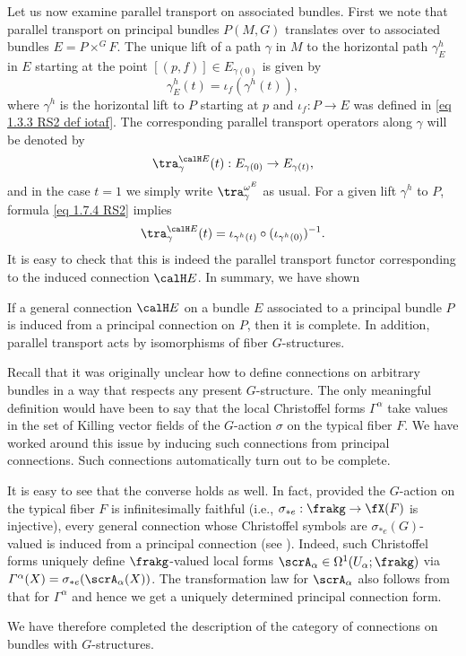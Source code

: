 Let us now examine parallel transport on associated bundles. First we note that parallel transport on principal bundles $P(M,G)$ translates over to associated bundles $E=P\times^G F$. The unique lift of a path $\gamma$ in $M$ to the horizontal path $\gamma_E^h$ in $E$ starting at the point $[(p,f)]\in E_{\gamma(0)}$ is  given by
\[\gamma^h_E(t)=\iota_f(\gamma^h(t)),\label{eq 1.7.7 RS2}\]
where $\gamma^h$ is the horizontal lift to $P$ starting at $p$ and $\iota_f:P\to E$ was defined in \eqref{eq 1.3.3 RS2 def iotaf}. The corresponding parallel transport operators along $\gamma$ will be denoted by
\[\tra_\gamma^{\calH E}(t):E_{\gamma(0)}\to E_{\gamma(t)},\]
and in the case $t=1$ we simply write $\tra_\gamma^{\omega^E}$ as usual. For a given lift $\gamma^h$ to $P$, formula \eqref{eq 1.7.4 RS2} implies 
\[\tra_\gamma^{\calH E}(t)=\iota_{\gamma^h(t)}\circ (\iota_{\gamma^h(0)})^{-1}.\label{eq 1.7.8 RS2}\]
It is easy to check that this is indeed the parallel transport functor corresponding to the induced connection $\calH E$. In summary, we have shown
\begin{cor}
    If a general connection $\calH E$ on a bundle $E$ associated to a principal bundle $P$ is induced from a principal connection on $P$, then it is complete. In addition, parallel transport acts by isomorphisms of fiber $G$-structures.
\end{cor}

\begin{rem}
    Recall that it was originally unclear how to define connections on arbitrary bundles in a way that respects any present $G$-structure. The only meaningful definition would have been to say that the local Christoffel forms $\varGamma^\alpha$ take values in the set of Killing vector fields of the $G$-action $\sigma$ on the typical fiber $F$. We have worked around this issue by inducing such connections from principal connections. Such connections automatically turn out to be complete. 
    
    It is easy to see that the converse holds as well. In fact, provided the $G$-action on the typical fiber $F$ is infinitesimally faithful (i.e., $\sigma_{\ast e}:\frakg\to \fX(F)$ is injective), every general connection whose Christoffel symbols are $\sigma_{\ast e}(G)$-valued is induced from a principal connection (see \cite{Kolar}). Indeed, such Christoffel forms uniquely define $\frakg$-valued local forms $\scrA_\alpha\in\Omega^1(U_\alpha;\frakg)$ via $\varGamma^\alpha(X)=\sigma_{\ast e}(\scrA_\alpha(X))$. The transformation law for $\scrA_\alpha$ also follows from that for $\varGamma^\alpha$ and hence we get a uniquely determined principal connection form.
    

    We have therefore completed the description of the category of connections on bundles with $G$-structures.
\end{rem}

